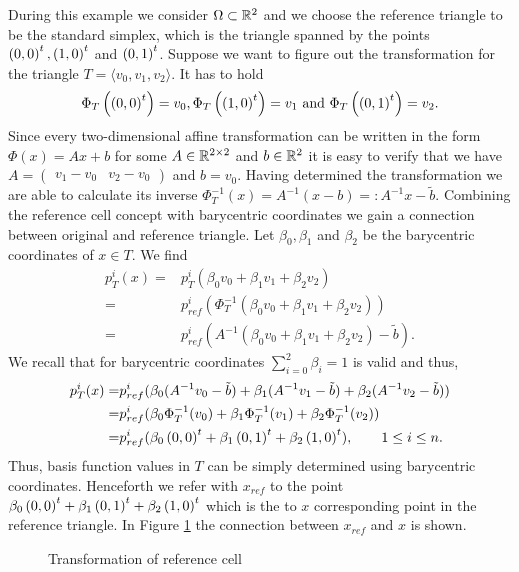 \begin{example}\label{ex: base cell trafo}
During this example we consider $\Omega \subset \mathbb{R}^2$ and we choose the reference triangle to be the standard simplex, which is the triangle spanned by the points $\left( 0, 0\right)^t, \left( 1, 0\right)^t$ and $\left( 0, 1\right)^t$.
Suppose we want to figure out the transformation for the triangle $T = \langle v_0,v_1,v_2 \rangle$.
It has to hold
\[
\Phi_T\left(\left( 0, 0\right)^t\right) = v_0, \Phi_T\left(\left( 1, 0\right)^t \right) = v_1 \textnormal{ and } \Phi_T\left(\left( 0, 1\right)^t\right) = v_2.
\]
Since every two-dimensional affine transformation can be written in the form $\Phi(x) = Ax+b$ for some $A \in \mathbb{R}^{2 \times 2}$ and $b \in \mathbb{R}^2$ it is easy to verify that we have $A = \begin{pmatrix} v_1-v_0 & v_2-v_0\end{pmatrix}$ and $b = v_0$.
Having determined the transformation we are able to calculate its inverse $\Phi_T^{-1}(x) = A^{-1} (x-b) =: A^{-1} x- \tilde b$.
Combining the reference cell concept with barycentric coordinates we gain a connection between original and reference triangle. Let $\beta_0, \beta_1$ and $\beta_2$ be the barycentric coordinates of $x \in T$. We find
\begin{align*}
	p^i_T(x) =& p_T^i( \beta_0 v_0 +\beta_1 v_1 + \beta_2 v_2  ) \\
	=& p^i_{ref}(\Phi_T^{-1}(\beta_0 v_0 +\beta_1 v_1 + \beta_2 v_2)) \\
	=& p^i_{ref}(A^{-1}(\beta_0 v_0 +\beta_1 v_1 + \beta_2 v_2)- \tilde b).
\end{align*}
We recall that for barycentric coordinates $\sum_{i=0}^2 \beta_i = 1$ is valid and thus,
\begin{align*}
	p^i_T(x)
	=& p^i_{ref}(\beta_0(A^{-1}v_0 -\tilde b) +\beta_1(A^{-1}v_1 -\tilde b) + \beta_2(A^{-1}v_2 -\tilde b))\\
	=& p^i_{ref}(\beta_0 \Phi_T^{-1}(v_0) +\beta_1 \Phi_T^{-1}(v_1) + \beta_2 \Phi_T^{-1}(v_2)) \\
	=& p^i_{ref}(\beta_0 \left( 0, 0\right)^t +\beta_1 \left( 0, 1\right)^t + \beta_2 \left( 1, 0\right)^t ), \qquad 1 \leq i \leq n.
\end{align*}
Thus, basis function values in $T$ can be simply determined using barycentric coordinates. Henceforth we refer with $x_{ref}$  to the point $\beta_0 \left( 0, 0\right)^t +\beta_1 \left( 0, 1\right)^t + \beta_2 \left( 1, 0\right)^t$ which is the to $x$ corresponding point in the reference triangle. In Figure \ref{fig: transformation} the connection between $x_{ref}$ and $x$ is shown.

\begin{figure}[h]
	\centering
	
	\caption{Transformation of reference cell}
	 \label{fig: transformation}
\end{figure}


\end{example}
